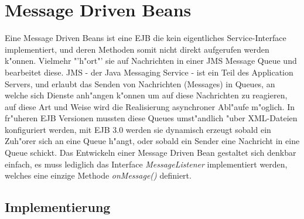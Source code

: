 \section{Message Driven Beans}
\label{sec:chap2:mdb}

Eine Message Driven Beans ist eine EJB die kein eigentliches Service-Interface implementiert,
und deren Methoden somit nicht direkt aufgerufen werden k"onnen. Vielmehr "'h"ort"' sie auf
Nachrichten in einer JMS Message Queue und bearbeitet diese.  JMS - der Java Messaging Service - 
ist ein Teil des Application Servers, und erlaubt das Senden von Nachrichten (Messages) in
Queues, an welche sich Dienste anh"angen k"onnen um auf diese Nachrichten zu reagieren,
auf diese Art und Weise wird die Realisierung asynchroner Abl"aufe m"oglich.
In fr"uheren EJB Versionen mussten diese Queues umst"andlich "uber XML-Dateien konfiguriert werden,
mit EJB 3.0 werden sie dynamisch erzeugt sobald ein Zuh"orer sich an eine Queue h"angt, oder
sobald ein Sender eine Nachricht in eine Queue schickt. Das Entwickeln einer Message Driven Bean 
gestaltet sich denkbar einfach, es muss lediglich das Interface \emph{MessageListener} implementiert
werden, welches eine einzige Methode \emph{onMessage()} definiert.

\subsection{Implementierung}
\label{sec:chap2:mdb:impl}

